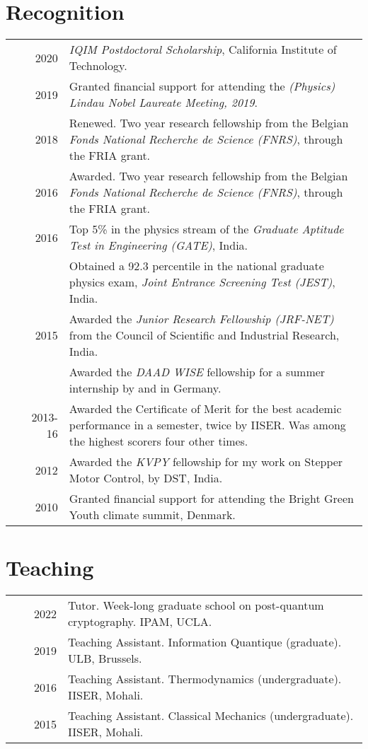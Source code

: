 \documentclass[a4paper,10pt]{article}
\begin{document}
\section{Recognition }
\begin{tabular}{rrp{11cm}}
  & ~~2020 & \emph{IQIM Postdoctoral Scholarship}, California Institute of Technology. \\
  & ~~2019 & Granted financial support for attending the \emph{(Physics) Lindau Nobel Laureate Meeting, 2019}. \\
  & ~~2018 & Renewed. Two year research fellowship from the Belgian \emph{Fonds National Recherche de Science (FNRS)}, through the FRIA grant.\normalsize\\
  & ~~2016 & Awarded. Two year research fellowship from the Belgian \emph{Fonds National Recherche de Science (FNRS)}, through the FRIA grant.\normalsize\\
 & ~~2016     & Top 5\% in the physics stream of the \emph{Graduate Aptitude Test in Engineering (GATE)}, India. \\
 & ~~~~~~     & Obtained a 92.3 percentile in the national graduate physics exam, \emph{Joint Entrance Screening Test (JEST)}, India. \\

 & ~~2015     & Awarded the \emph{Junior Research Fellowship (JRF-NET)} from the Council of Scientific and Industrial Research, India. \\
 & ~~~~~~     & Awarded the \emph{DAAD WISE} fellowship for a summer internship by and in Germany.\\
 & 2013-16  & Awarded the Certificate of Merit for the best academic performance in a semester, twice by IISER. Was among the highest scorers four other times.\\
 & ~~2012     & Awarded the \emph{KVPY} fellowship for my work on Stepper Motor Control, by DST, India.\\
 & ~~2010     & Granted financial support for attending the Bright Green Youth climate summit, Denmark.
\end{tabular}


  \section{Teaching}
  \begin{tabular}{rrp{11cm}}
  & ~~2022 &Tutor. Week-long graduate school on post-quantum cryptography. IPAM, UCLA.\\
  & ~~2019 &Teaching Assistant. Information Quantique (graduate). ULB, Brussels.\\  
  & ~~2016 &Teaching Assistant. Thermodynamics (undergraduate). IISER, Mohali.\\
  & ~~2015 &Teaching Assistant. Classical Mechanics (undergraduate). IISER, Mohali.
  \end{tabular}
\end{document}
